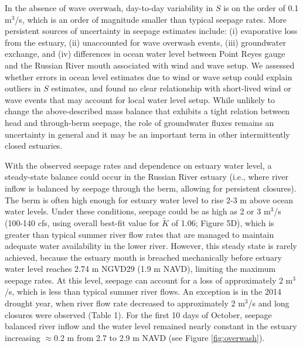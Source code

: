 \documentclass[preprint,12pt,authoryear]{elsarticle}
\begin{document}
In the absence of wave overwash,  day-to-day variability in $S$ is on the order of 0.1 m$^3$/s, which is an order of magnitude smaller than typical seepage rates. More persistent sources of uncertainty in seepage estimates include: 
(i)  evaporative loss from the estuary, 
(ii) unaccounted for wave overwash events, 
(iii) groundwater exchange, and 
(iv) differences in ocean water level between Point Reyes gauge and the Russian River mouth associated with wind and wave setup. 
We assessed whether errors in ocean level estimates due to wind or wave setup could  explain outliers in $S$ estimates, and found no clear relationship with short-lived wind or wave events that may account for local water level setup. 
While unlikely to change the above-described mass balance that exhibits a tight relation between head and through-berm seepage, the role of groundwater fluxes remains an uncertainty in general and it may be an important term in other intermittently closed estuaries.

With the observed seepage rates and dependence on estuary water level, a steady-state balance could occur in the Russian River estuary (i.e., where river inflow is balanced by seepage through the berm, allowing for persistent closures). The berm is often high enough for estuary water level to rise 2-3 m above ocean water levels. Under these conditions, seepage could be as high as 2 or 3 m$^3$/s (100-140 cfs, using overall best-fit value for $\tilde K$ of 1.06; Figure 5D), which is greater than typical summer river flow rates that are managed to maintain adequate water availability in the lower river.
However, this steady state is rarely achieved, because 
the estuary mouth is breached mechanically before estuary water level reaches 2.74 m NGVD29 (1.9 m NAVD), limiting the maximum seepage rates.
At this level, seepage can account for a loss of approximately 2 m$^3$/s, which is less than typical summer river flows. An exception is in the 2014 drought year, when river flow rate decreased to  approximately 2 m$^3$/s and long closures were observed (Table 1). For the first 10 days of October, seepage balanced river inflow and the water level remained nearly constant in the estuary increasing $\approx$0.2 m from 2.7 to 2.9 m NAVD (see Figure \ref{fig:overwash}). 
\end{document}

